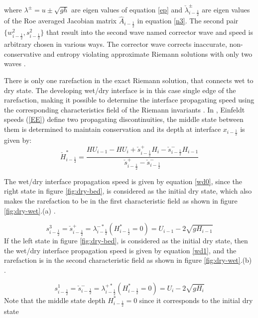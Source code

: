 \documentclass[10pt,a4paper]{article}
\begin{document}
	where $\lambda^{\pm} = u\pm \sqrt{gh}$ are eigen values of equation \eqref{ep} and $\check{\lambda}_{i-\frac{1}{2}}^{\pm}$ are eigen values of the Roe averaged Jacobian matrix $\hat{A}_{i-\frac{1}{2}}$ in equation \eqref{n3}. The second pair $	\{w^{2}_{i-\frac{1}{2}},s^{2}_{i-\frac{1}{2}}\}$  that result into the second wave named corrector wave and speed is arbitrary chosen in various ways. The corrector wave corrects inaccurate, non-conservative and entropy violating approximate Riemann solutions with only two waves \cite{be-ge-le-ma:2011}.
	
	
	There is only one rarefaction in the exact Riemann solution, that connects wet to dry state. The developing wet/dry interface is in this case single edge of the rarefaction, making it possible to determine the interface propagating speed using the corresponding characteristics field of the Riemann invariants \cite{le-ge-be:2011}. In  \citet{george2006finite,ge:2008}, Einfeldt speeds (\eqref{EE})  define two propagating discontinuities, the  middle state between them is determined to maintain conservation and its depth at interface $x_{i-\frac{1}{2}}$ is given by:
	\begin{equation}
		\check{H}^{*}_{i-\frac{1}{2}} = \frac{HU_{i-1} -HU_{i} + \check{s}_{i-\frac{1}{2}}^{+}H_{i} -\check{s}_{i-\frac{1}{2}}^{-} H_{i-1}  }{\check{s}_{i-\frac{1}{2}}^{+} - \check{s}_{i-\frac{1}{2}}^{-}  }
	\end{equation}
	
	The wet/dry interface propagation  speed  is given by equation \eqref{wd0}, since the right state in figure \ref{fig:dry-bed}, is considered as the initial dry state, which also makes the rarefaction to be in the first characteristic field as shown in figure \ref{fig:dry-wet}.(a)  \cite{ge:2008}.
	
	\begin{equation}
		s_{i-\frac{1}{2}}^{3} = \check{s}_{i-\frac{1}{2}}^{+} = \lambda_{i-\frac{1}{2}}^{-*}(H^{*}_{i-\frac{1}{2}}=0)= U_{i-1} - 2\sqrt{gH_{i-1}}
		\label{wd0}
	\end{equation}
	If the left state in figure \ref{fig:dry-bed}, is considered as the initial dry state, then the  wet/dry interface propagation  speed  is given by equation \eqref{wd1}, and the  rarefaction is in the second characteristic field  as shown in figure \ref{fig:dry-wet}.(b)  \cite{ge:2008}.
	
	\begin{equation}
		s_{i-\frac{1}{2}}^{1} = \check{s}_{i-\frac{1}{2}}^{-} = \lambda_{i-\frac{1}{2}}^{+*}(H^{*}_{i-\frac{1}{2}}=0)= U_{i} - 2\sqrt{gH_{i}}
		\label{wd1}
	\end{equation}
	Note that the middle state depth $H^{*}_{i-\frac{1}{2}}=0$ since it corresponds to the initial dry state
	
\end{document}
